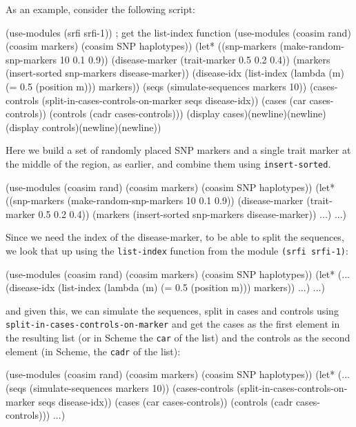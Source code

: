 \documentclass{manual}
\begin{document}
\begin{empfile}
As an example, consider the following script:
\begin{code}
(use-modules (srfi srfi-1)) ; get the list-index function
(use-modules (coasim rand) (coasim markers) (coasim SNP haplotypes))
(let* ((snp-markers    (make-random-snp-markers 10 0.1 0.9))
       (disease-marker (trait-marker 0.5 0.2 0.4))
       (markers (insert-sorted snp-markers disease-marker))
       (disease-idx (list-index (lambda (m) (= 0.5 (position m))) markers))
       (seqs (simulate-sequences markers 10))
       (cases-controls (split-in-cases-controls-on-marker seqs disease-idx))
       (cases (car cases-controls))
       (controls (cadr cases-controls)))
  (display cases)(newline)(newline)
  (display controls)(newline)(newline))
\end{code}
Here we build a set of randomly placed SNP markers and a single trait
marker at the middle of the region, as earlier, and combine them using
\texttt{insert-sorted}.
\begin{code}
(use-modules (coasim rand) (coasim markers) (coasim SNP haplotypes))
(let* ((snp-markers    (make-random-snp-markers 10 0.1 0.9))
       (disease-marker (trait-marker 0.5 0.2 0.4))
       (markers (insert-sorted snp-markers disease-marker))
       ...)
  ...)
\end{code}
Since we need the index of the disease-marker, to be able to split the
sequences, we look that up using the \texttt{list-index} function from
the module \texttt{(srfi srfi-1)}:
\begin{code}
(use-modules (coasim rand) (coasim markers) (coasim SNP haplotypes))
(let* (...
       (disease-idx (list-index (lambda (m) (= 0.5 (position m))) markers))
       ...)
  ...)
\end{code}
and given this, we can simulate the sequences, split in cases and
controls using \texttt{split-in-cases-controls-on-marker} and get the cases as
the first element in the resulting list (or in Scheme the \texttt{car}
of the list) and the controls as the second element (in Scheme, the
\texttt{cadr} of the list):
\begin{code}
(use-modules (coasim rand) (coasim markers) (coasim SNP haplotypes))
(let* (...
       (seqs (simulate-sequences markers 10))
       (cases-controls (split-in-cases-controls-on-marker seqs disease-idx))
       (cases (car cases-controls))
       (controls (cadr cases-controls)))
  ...)
\end{code}


\end{empfile}
\end{document}
